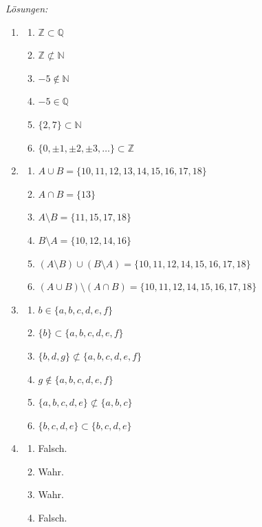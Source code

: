 \clearpage
\emph{Lösungen:}
\begin{enumerate}
    \item
          \begin{enumerate}
              \item \(\mathbb{Z} \subset \mathbb{Q}\)
              \item \(\mathbb{Z} \not\subset \mathbb{N}\)
              \item \(-5 \notin \mathbb{N}\)
              \item \(-5 \in \mathbb{Q}\)
              \item \(\{2,7\} \subset \mathbb{N}\)
              \item \(\{0,\pm1,\pm2,\pm3,\ldots\} \subset \mathbb{Z}\)
          \end{enumerate}

    \item
          \begin{enumerate}
              \item \(A \cup B = \{10,11,12,13,14,15,16,17,18\}\)
              \item \(A \cap B = \{13\}\)
              \item \(A \setminus B = \{11,15,17,18\}\)
              \item \(B \setminus A = \{10,12,14,16\}\)
              \item \((A \setminus B)\cup(B \setminus A) = \{10,11,12,14,15,16,17,18\}\)
              \item \((A \cup B)\setminus(A \cap B) = \{10,11,12,14,15,16,17,18\}\)
          \end{enumerate}

    \item
          \begin{enumerate}
              \item \(b \in \{a,b,c,d,e,f\}\)
              \item \(\{b\} \subset \{a,b,c,d,e,f\}\)
              \item \(\{b,d,g\} \not\subset \{a,b,c,d,e,f\}\)
              \item \(g \notin \{a,b,c,d,e,f\}\)
              \item \(\{a,b,c,d,e\} \not\subset \{a,b,c\}\)
              \item \(\{b,c,d,e\} \subset \{b,c,d,e\}\)
          \end{enumerate}

    \item
          \begin{enumerate}
              \item Falsch.
              \item Wahr.
              \item Wahr.
              \item Falsch.
          \end{enumerate}


\end{enumerate}
